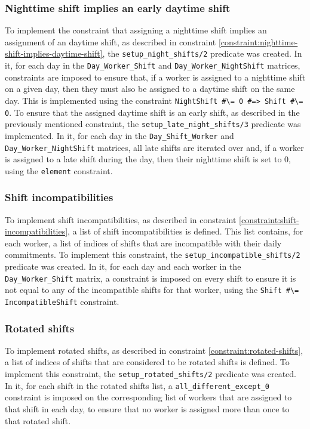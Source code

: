 \documentclass[conference]{IEEEtran}
\def\constraint#1{\vspace{4pt} {#1}}
\begin{document}
\constraint {
    \subsubsection*{Nighttime shift implies an early daytime shift}
    To implement the constraint that assigning a nighttime shift implies an assignment of an daytime shift, as described in constraint \ref{constraint:nighttime-shift-implies-daytime-shift}, the \texttt{setup\_night\_shifts/2} predicate was created. In it, for each day in the \texttt{Day\_Worker\_Shift} and \texttt{Day\_Worker\_NightShift} matrices, constraints are imposed to ensure that, if a worker is assigned to a nighttime shift on a given day, then they must also be assigned to a daytime shift on the same day. This is implemented using the constraint \texttt{NightShift \#\textbackslash= 0 \#=> Shift \#\textbackslash= 0}. To ensure that the assigned daytime shift is an early shift, as described in the previously mentioned constraint, the \texttt{setup\_late\_night\_shifts/3} predicate was implemented. In it, for each day in the \texttt{Day\_Shift\_Worker} and \texttt{Day\_Worker\_NightShift} matrices, all late shifts are iterated over and, if a worker is assigned to a late shift during the day, then their nighttime shift is set to 0, using the \texttt{element} constraint.
}

\constraint {
    \subsubsection*{Shift incompatibilities}   
    To implement shift incompatibilities, as described in constraint \ref{constraint:shift-incompatibilities}, a list of shift incompatibilities is defined. This list contains, for each worker, a list of indices of shifts that are incompatible with their daily commitments.
    To implement this constraint, the \texttt{setup\_incompatible\_shifts/2} predicate was created. In it, for each day and each worker in the \texttt{Day\_Worker\_Shift} matrix, a constraint is imposed on every shift to ensure it is not equal to any of the incompatible shifts for that worker, using the \texttt{Shift \#\textbackslash= IncompatibleShift} constraint.
}

\constraint {
    \subsubsection*{Rotated shifts}
    To implement rotated shifts, as described in constraint \ref{constraint:rotated-shifts}, a list of indices of shifts that are considered to be rotated shifts is defined.
    To implement this constraint, the \texttt{setup\_rotated\_shifts/2} predicate was created. In it, for each shift in the rotated shifts list, a \texttt{all\_different\_except\_0} constraint is imposed on the corresponding list of workers that are assigned to that shift in each day, to ensure that no worker is assigned more than once to that rotated shift.
}
\end{document}
